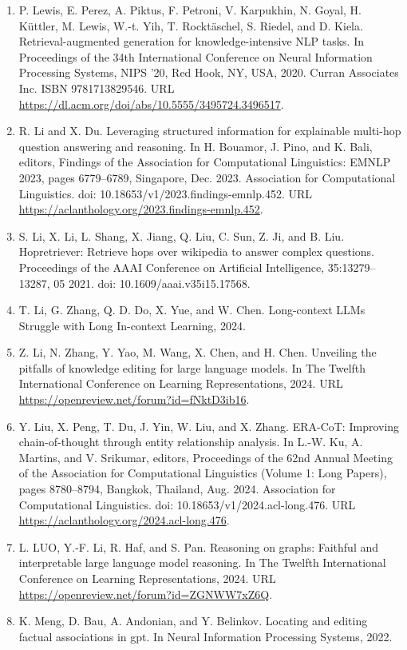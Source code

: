\documentclass[11pt,UTF8,fontset=fandol]{ctexart}
\begin{document}
\begin{enumerate}[leftmargin=2em]
\item P. Lewis, E. Perez, A. Piktus, F. Petroni, V. Karpukhin, N. Goyal, H. K\"uttler, M. Lewis, W.-t. Yih, T. Rockt\"aschel, S. Riedel, and D. Kiela. Retrieval-augmented generation for knowledge-intensive NLP tasks. In Proceedings of the 34th International Conference on Neural Information Processing Systems, NIPS '20, Red Hook, NY, USA, 2020. Curran Associates Inc. ISBN 9781713829546. URL \url{https://dl.acm.org/doi/abs/10.5555/3495724.3496517}.
\item R. Li and X. Du. Leveraging structured information for explainable multi-hop question answering and reasoning. In H. Bouamor, J. Pino, and K. Bali, editors, Findings of the Association for Computational Linguistics: EMNLP 2023, pages 6779--6789, Singapore, Dec. 2023. Association for Computational Linguistics. doi: 10.18653/v1/2023.findings-emnlp.452. URL \url{https://aclanthology.org/2023.findings-emnlp.452}.
\item S. Li, X. Li, L. Shang, X. Jiang, Q. Liu, C. Sun, Z. Ji, and B. Liu. Hopretriever: Retrieve hops over wikipedia to answer complex questions. Proceedings of the AAAI Conference on Artificial Intelligence, 35:13279--13287, 05 2021. doi: 10.1609/aaai.v35i15.17568.
\item T. Li, G. Zhang, Q. D. Do, X. Yue, and W. Chen. Long-context LLMs Struggle with Long In-context Learning, 2024.
\item Z. Li, N. Zhang, Y. Yao, M. Wang, X. Chen, and H. Chen. Unveiling the pitfalls of knowledge editing for large language models. In The Twelfth International Conference on Learning Representations, 2024. URL \url{https://openreview.net/forum?id=fNktD3ib16}.
\item Y. Liu, X. Peng, T. Du, J. Yin, W. Liu, and X. Zhang. ERA-CoT: Improving chain-of-thought through entity relationship analysis. In L.-W. Ku, A. Martins, and V. Srikumar, editors, Proceedings of the 62nd Annual Meeting of the Association for Computational Linguistics (Volume 1: Long Papers), pages 8780--8794, Bangkok, Thailand, Aug. 2024. Association for Computational Linguistics. doi: 10.18653/v1/2024.acl-long.476. URL \url{https://aclanthology.org/2024.acl-long.476}.
\item L. LUO, Y.-F. Li, R. Haf, and S. Pan. Reasoning on graphs: Faithful and interpretable large language model reasoning. In The Twelfth International Conference on Learning Representations, 2024. URL \url{https://openreview.net/forum?id=ZGNWW7xZ6Q}.
\item K. Meng, D. Bau, A. Andonian, and Y. Belinkov. Locating and editing factual associations in gpt. In Neural Information Processing Systems, 2022.

\end{enumerate}
\end{document}

